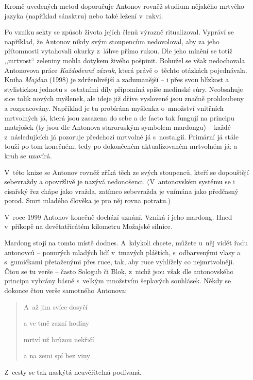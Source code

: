 Kromě uvedených metod doporučuje Antonov rovněž studium nějakého mrtvého jazyka (například sánsktru) nebo také ležení v~rakvi.

Po vzniku sekty se způsob života jejích členů výrazně ritualizoval.  Vypráví se například, že Antonov nikdy svým stoupencům nedovoloval, aby za jeho přítomnosti vytahovali okurky z~láhve přímo rukou. Dle jeho mínění se totiž ,,mrtvost`` zeleniny mohla dotykem živého pošpinit. Bohužel se však nedochovala Antonovova práce \textit{Každodenní zázrak}, která právě o~těchto otázkách pojednávala. Kniha \textit{Majdan} (1998) je zdrženlivější a zadumanější -- i přes svou blízkost a stylistickou jednotu s~ostatními díly připomíná spíše medinské súry. Neobsahuje sice tolik nových myšlenek, ale ideje již dříve vyslovené jsou značně prohloubeny a rozpracovány. Například je tu probírána myšlenka o~množství vnitřních mrtvolných já, která jsou zasazena do sebe a  de facto tak fungují na principu matrjošek (ty jsou dle Antonova staroruským symbolem mardongu) -- každé z~následujících já pozoruje předchozí mrtvolné já s~nostalgií. Primární já stále touží po tom konečném, tedy po dokončeném aktualizovaném mrtvolném já; a kruh se uzavírá.

V~této knize se Antonov rovněž zříká těch ze svých stoupenců, kteří se dopouštějí sebevraždy a opovržlivě je nazývá nedonošenci. (V~antonovském systému se i císařský řez chápe jako vražda, zatímco sebevražda je vnímána jako předčasný porod. Smrt mladého člověka je pro něj rovna potratu.)

V~roce 1999 Antonov konečně dochází uznání. Vzniká i jeho mardong. Hned v~příkopě na devětatřicátém kilometru Možajské silnice.

Mardong stojí na tomto místě dodnes. A~kdykoli chcete, můžete u~něj vidět řadu antonovců -- ponurých mladých lidí v~tmavých pláštích, s~odbarvenými vlasy a s~gumičkami přetaženými přes ruce, tak, aby ruce vyhlížely co nejmrtvolněji. Čtou se tu verše -- často Sologub či Blok, z~nichž jsou však dle antonovského principu vybrány básně s~velkým množstvím šeplavých souhlásek. Někdy se dokonce čtou verše samotného Antonova:

\begin{verse}
	A~až jim svíce dosyčí

	a ve tmě zazní hodiny

	mrtví už hrůzou nekřičí

	a na zemi spí bez viny
\end{verse}

\noindent
Z~cesty se tak naskýtá neuvěřitelná podívaná.


